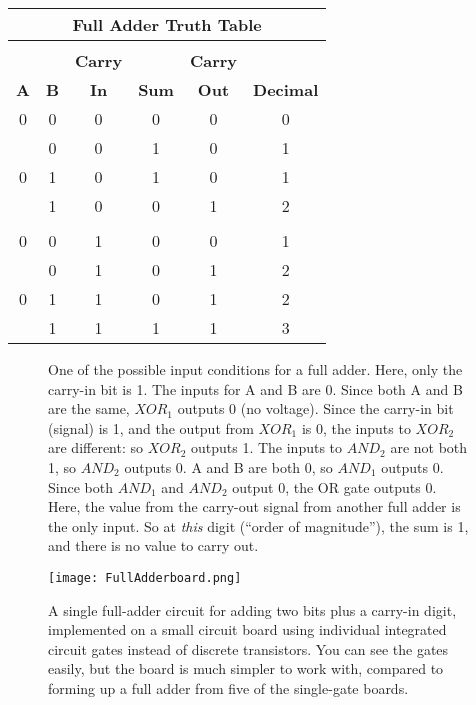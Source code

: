 \begin{center}
\begin{tabular}{ccc  cc  c}
\multicolumn{6}{c}{\textbf{Full Adder Truth Table}}\\
\hline\\[\negsep]
 &  & \textbf{Carry} &  & \textbf{Carry} & \\
\textbf{A} & \textbf{B} & \textbf{In} & \textbf{Sum} & \textbf{Out} & \textbf{Decimal}\\
\hline
0 & 0 & 0 & 0  & 0 & 0 \\
\grr
1 & 0 & 0 & 1  & 0 & 1 \\
0 & 1 & 0 & 1  & 0 & 1 \\
\grr
1 & 1 & 0 & 0  & 1 & 2 \\[\sep]
\hline\\[\negsep]
0 & 0 & 1 & 0  & 0 & 1 \\
\grr
1 & 0 & 1 & 0  & 1 & 2 \\
0 & 1 & 1 & 0  & 1 & 2 \\
\grr
1 & 1 & 1 & 1  & 1 & 3 \\

\hline
\end{tabular}
\end{center}

\begin{figure}[!ht]
\begin{center}

\caption{One of the possible input conditions for a full adder. Here, only the carry-in bit is 1. The inputs for A and B are 0. Since both A and B are the same, $XOR_1$ outputs 0 (no voltage). Since the carry-in bit (signal) is 1, and the output from $XOR_1$ is 0, the inputs to $XOR_2$ are different: so $XOR_2$ outputs 1. The inputs to $AND_2$ are not both 1, so $AND_2$ outputs 0. A and B are both 0, so $AND_1$ outputs 0. Since both $AND_1$ and $AND_2$ output 0, the OR gate outputs 0. Here, the value from the carry-out signal from another full adder is the only input. So at \emph{this} digit (``order of magnitude''), the sum is 1, and there is no value to carry out. }
\end{center}
\end{figure}


\begin{figure}[!ht]
\begin{center}
\texttt{[image: FullAdderboard.png]}
\caption{A single full-adder circuit for adding two bits plus a carry-in digit, implemented on a small circuit board using individual integrated circuit gates instead of discrete transistors. You can see the gates easily, but the board is much simpler to work with, compared to forming up a full adder from five of the single-gate boards.}
\end{center}
\end{figure}




